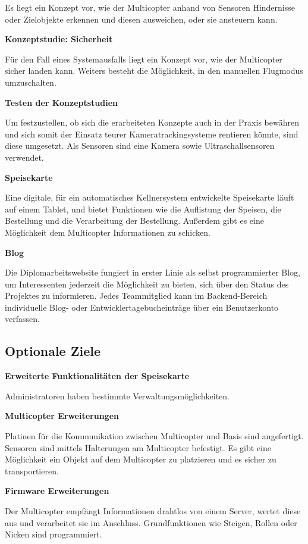   Es liegt ein Konzept vor, wie der Multicopter anhand von Sensoren Hindernisse oder Zielobjekte
  erkennen und diesen ausweichen, oder sie ansteuern kann.

  \textbf{Konzeptstudie: Sicherheit}

  Für den Fall eines Systemausfalls liegt ein Konzept vor, wie der Multicopter sicher landen kann.
  Weiters besteht die Möglichkeit, in den manuellen Flugmodus umzuschalten.

  \textbf{Testen der Konzeptstudien}

  Um festzustellen, ob sich die erarbeiteten Konzepte auch in der Praxis bewähren und sich somit der Einsatz teurer Kameratrackingsysteme rentieren könnte, sind diese umgesetzt.
  Als Sensoren sind eine Kamera sowie Ultraschallsensoren verwendet.

  \textbf{Speisekarte}

  Eine digitale, für ein automatisches Kellnersystem entwickelte Speisekarte läuft auf einem Tablet,
  und bietet Funktionen wie die Auflistung der Speisen, die Bestellung und die Verarbeitung der Bestellung.
  Außerdem gibt es eine Möglichkeit dem Multicopter Informationen zu schicken.

  \textbf{Blog}

  Die Diplomarbeitswebsite fungiert in erster Linie als selbst programmierter Blog, um Interessenten
  jederzeit die Möglichkeit zu bieten, sich über den Status des Projektes zu informieren. Jedes Teammitglied
  kann im Backend-Bereich individuelle Blog- oder Entwicklertagebucheinträge über ein Benutzerkonto verfassen.

  \subsection{Optionale Ziele}
  \textbf{Erweiterte Funktionalitäten der Speisekarte}

  Administratoren haben bestimmte Verwaltungsmöglichkeiten.

  \textbf{Multicopter Erweiterungen}

  Platinen für die Kommunikation zwischen Multicopter und Basis sind angefertigt.
  Sensoren sind mittels Halterungen am Multicopter befestigt.
  Es gibt eine Möglichkeit ein Objekt auf dem Multicopter zu platzieren und es sicher zu transportieren.

  \textbf{Firmware Erweiterungen}

  Der Multicopter empfängt Informationen drahtlos von einem Server,
  wertet diese aus und verarbeitet sie im Anschluss.
  Grundfunktionen wie Steigen, Rollen oder Nicken sind programmiert.

